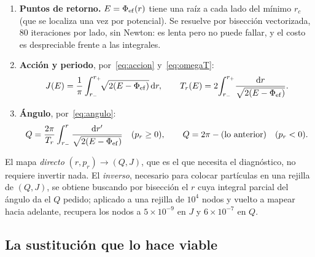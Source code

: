 \documentclass[11pt,a4paper]{article}
\newcommand{\dd}{\mathrm{d}}
\newcommand{\rp}{p_r}
\newcommand{\Jr}{J}
\newcommand{\Qr}{Q}
\theoremstyle{definition}
\begin{document}
\begin{enumerate}
  \item \textbf{Puntos de retorno.} $E=\Phi_{\rm ef}(r)$ tiene una raíz a cada lado del
    mínimo $r_c$ (que se localiza una vez por potencial). Se resuelve por bisección
    vectorizada, 80 iteraciones por lado, sin Newton: es lenta pero no puede fallar,
    y el costo es despreciable frente a las integrales.
  \item \textbf{Acción y periodo}, por~\eqref{eq:accion} y~\eqref{eq:omegaT}:
    \begin{equation}
      \Jr(E)=\frac{1}{\pi}\int_{r_-}^{r_+}\!\!\sqrt{2(E-\Phi_{\rm ef})}\,\dd r,
      \qquad
      T_r(E)=2\!\int_{r_-}^{r_+}\!\frac{\dd r}{\sqrt{2(E-\Phi_{\rm ef})}} .
    \end{equation}
  \item \textbf{Ángulo}, por~\eqref{eq:angulo}:
    \begin{equation}
      \Qr = \frac{2\pi}{T_r}\int_{r_-}^{r}\frac{\dd r'}{\sqrt{2(E-\Phi_{\rm ef})}}
      \quad (\rp\ge0),
      \qquad
      \Qr = 2\pi - (\text{lo anterior}) \quad (\rp<0).
    \end{equation}
\end{enumerate}

El mapa \emph{directo} $(r,\rp)\to(\Qr,\Jr)$, que es el que necesita el diagnóstico,
no requiere invertir nada. El \emph{inverso}, necesario para colocar partículas en
una rejilla de $(\Qr,\Jr)$, se obtiene buscando por bisección el $r$ cuya integral
parcial del ángulo da el $\Qr$ pedido; aplicado a una rejilla de $10^4$ nodos y
vuelto a mapear hacia adelante, recupera los nodos a $5\times10^{-9}$ en $\Jr$ y
$6\times10^{-7}$ en $\Qr$.

\subsection{La sustitución que lo hace viable}
\label{sec:sustitucion}
\end{document}

